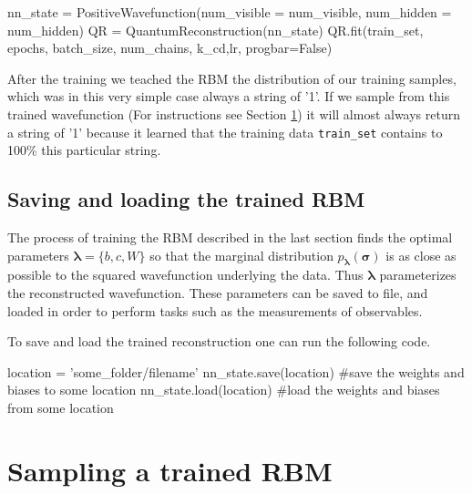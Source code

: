 \documentclass[submission, Phys]{SciPost}
\begin{document}
\begin{python}
nn_state = PositiveWavefunction(num_visible = num_visible,
						                    num_hidden = num_hidden)
QR = QuantumReconstruction(nn_state)
QR.fit(train_set, epochs, batch_size, num_chains, k_cd,lr, progbar=False)
\end{python}

After the training we teached the RBM the distribution of our training samples, which was in this very simple case always a string of '1'. If we sample from this trained wavefunction (For instructions see Section \ref{Sec:Sampling_a-Trained_RBM}) it will almost always return a string of '1' because it learned that the training data \verb|train_set| contains to 100\% this particular string.


\subsection{Saving and loading the trained RBM}

The process of training the RBM described in the last section finds the optimal parameters $\bm{\lambda} = \{b,c,W\}$ so that 
the marginal distribution $p_{\bm{\lambda}} ( \bm{\sigma})$ is as close as possible to the squared wavefunction underlying the data.
Thus $\bm{\lambda}$ parameterizes the reconstructed wavefunction.  These parameters can be saved to file, and loaded in order to perform tasks such as the measurements of observables.

To save and load the trained reconstruction one can run the following code.

\begin{python}
location = 'some_folder/filename'
nn_state.save(location) #save the weights and biases to some location
nn_state.load(location) #load the weights and biases from some location
\end{python}


\section{Sampling a trained RBM}
\label{Sec:Sampling_a-Trained_RBM}
\end{document}
